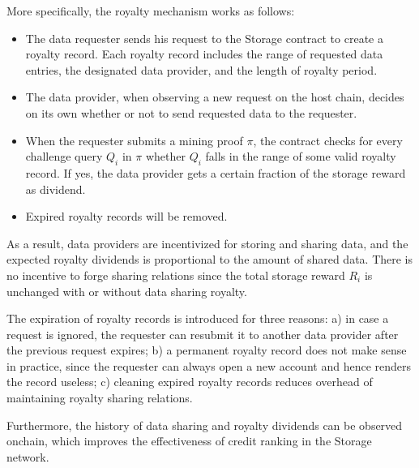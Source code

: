 More specifically, the royalty mechanism works as follows:
\begin{itemize}
 	\item The data requester sends his request to the \projabbrev Storage contract to create a royalty record. Each royalty record includes the range of requested data entries, the designated data provider, and the length of royalty period.
 	
 	\item The data provider, when observing a new request on the host chain, decides on its own whether or not to send requested data to the requester.

 	\item When the requester submits a mining proof $\pi$, the \project contract checks for every \sproof challenge query $Q_i$  in $\pi$ whether $Q_i$ falls in the range of some valid royalty record.
 	If yes, the data provider gets a certain fraction of the storage reward as  dividend.


 	\item Expired royalty records will be removed.
\end{itemize}  

As a result, data providers are incentivized for storing and sharing data,
and the expected royalty dividends is proportional to the amount of shared data.
There is no incentive to forge sharing relations since the total storage reward $R_i$ is unchanged with or without data sharing royalty.

The expiration of royalty records is introduced for three reasons: a) in case a request is ignored, the requester can resubmit it to another data provider after the previous request expires;
b) a permanent royalty record does not make sense in practice, since the requester can always open a new account and hence renders the record useless;
c) cleaning expired royalty records reduces overhead of maintaining royalty sharing relations.

Furthermore, the history of data sharing and royalty dividends can be observed onchain, which improves the effectiveness of credit ranking in the \projabbrev Storage network.





